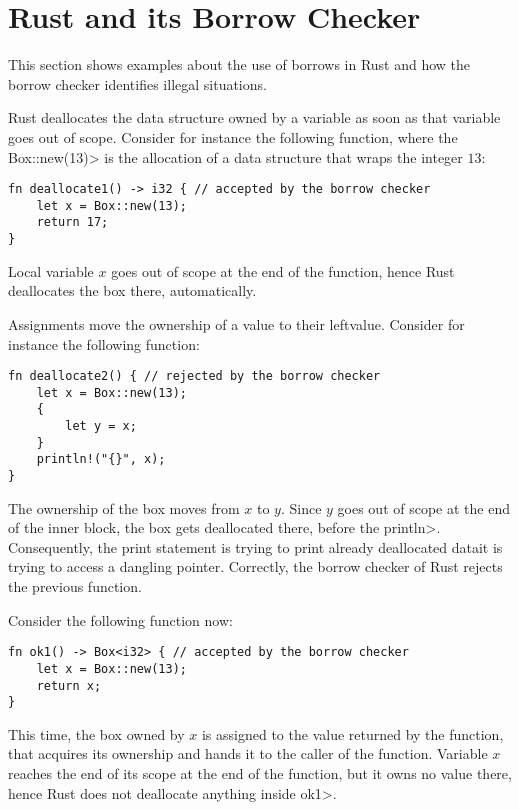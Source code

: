 \section{Rust and its Borrow Checker}\label{sec:rust}

This section shows examples about the use of borrows in
Rust and how the borrow checker identifies illegal situations.

Rust deallocates the data structure owned by a variable
as soon as that variable goes out of scope. Consider for instance
the following function, where the \<Box::new(13)> is the allocation of
a data structure that wraps the integer $13$:

\begin{verbatim}
fn deallocate1() -> i32 { // accepted by the borrow checker
    let x = Box::new(13);
    return 17;
}
\end{verbatim}

\noindent
Local variable $x$ goes out of scope at the end of the function,
hence Rust deallocates the box there, automatically.

Assignments move the ownership of a value to their leftvalue. Consider
for instance the following function:

\begin{verbatim}
fn deallocate2() { // rejected by the borrow checker
    let x = Box::new(13);
    {
        let y = x;
    }
    println!("{}", x);
}
\end{verbatim}

\noindent
The ownership of the box moves from $x$ to $y$. Since $y$ goes out of scope
at the end of the inner block, the box gets deallocated there, before the
\<println>. Consequently, the print statement is trying to print
already deallocated data\ie it is trying to access a dangling pointer.
Correctly, the borrow checker of Rust rejects the previous function.

Consider the following function now:

\begin{verbatim}
fn ok1() -> Box<i32> { // accepted by the borrow checker
    let x = Box::new(13);
    return x;
}
\end{verbatim}

\noindent
This time, the box owned by $x$ is assigned to the value returned by
the function, that acquires its ownership and hands it to the caller of
the function. Variable $x$ reaches the end of its scope at the end of the
function, but it owns no value there, hence Rust does not deallocate
anything inside \<ok1>.

